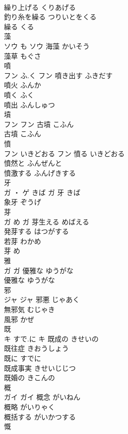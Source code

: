 \documentclass[8pt]{extreport}
\begin{document}
\begin{CJK}{UTF8}{min}
\\	繰り上げる	くりあげる	
\\	釣り糸を繰る	つりいとをくる	
\\	繰る	くる	
\\	藻	
\\	ソウ	も	ソウ	海藻	かいそう	
\\	藻草	もぐさ	
\\	噴	
\\	フン	ふ.く	フン	噴き出す	ふきだす	
\\	噴火	ふんか	
\\	噴く	ふく	
\\	噴出	ふんしゅつ	
\\	墳	
\\	フン		フン	古墳	こふん	
\\	古墳	こふん	
\\	憤	
\\	フン	いきどおる	フン	憤る	いきどおる	
\\	憤然と	ふんぜんと	
\\	憤激する	ふんげきする	
\\	牙	
\\	ガ ・ ゲ	きば	ガ													牙	きば	
\\	象牙	ぞうげ	
\\	芽	
\\	ガ	め	ガ	芽生える	めばえる	
\\	発芽する	はつがする	
\\	若芽	わかめ	
\\	芽	め	
\\	雅	
\\	ガ		ガ	優雅な	ゆうがな	
\\	優雅な	ゆうがな	
\\	邪	
\\	ジャ		ジャ	邪悪	じゃあく	
\\	無邪気	むじゃき	
\\	風邪	かぜ	
\\	既	
\\	キ	すで.に	キ	既成の	きせいの	
\\	既往症	きおうしょう	
\\	既に	すでに	
\\	既成事実	きせいじじつ	
\\	既婚の	きこんの	
\\	概	
\\	ガイ		ガイ	概念	がいねん	
\\	概略	がいりゃく	
\\	概括する	がいかつする	
\\	慨	

\end{CJK}
\end{document}
